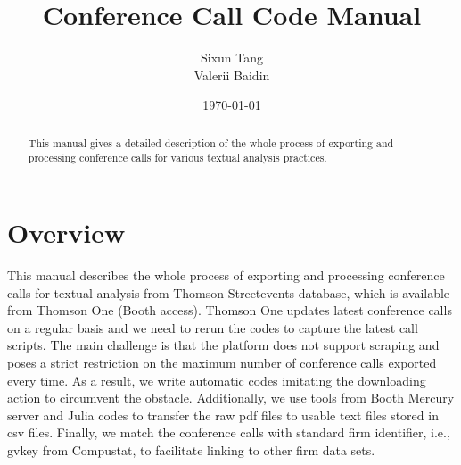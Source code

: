 \documentclass[11pt]{article}
\newcounter{file}
\begin{document}
\begin{titlepage}

\title{Conference Call Code Manual}
\date{\today}
\author{Sixun Tang \\ Valerii Baidin}
\maketitle
\begin{abstract}
This manual gives a detailed description of the whole process of exporting and processing conference calls for various textual analysis practices.


\bigskip
\end{abstract}

\setcounter{page}{0}
\thispagestyle{empty}
\end{titlepage}

\pagebreak
\newpage
	
\doublespacing
\tableofcontents

\newpage

\section{Overview}
\par This manual describes the whole process of exporting and processing conference calls for textual analysis from Thomson Streetevents database, which is available from Thomson One (Booth access). Thomson One updates latest conference calls on a regular basis and we need to rerun the codes to capture the latest call scripts. The main challenge is that the platform does not support scraping and poses a strict restriction on the maximum number of conference calls exported every time. As a result, we write automatic codes imitating the downloading action to circumvent the obstacle. Additionally, we use tools from Booth Mercury server and Julia codes to transfer the raw pdf files to usable text files stored in csv files. Finally, we match the conference calls with standard firm identifier, i.e., gvkey from Compustat, to facilitate linking to other firm data sets.
\end{document}
